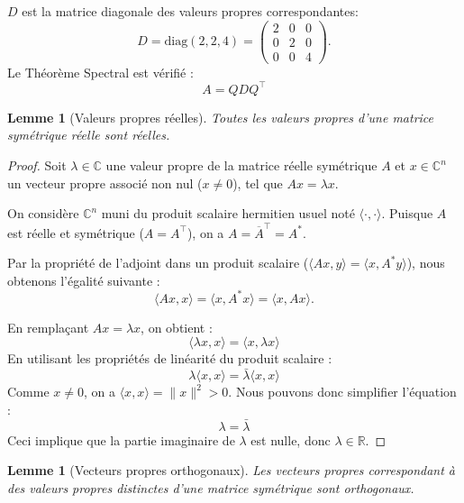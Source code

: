 \documentclass[12pt]{report}
\newtheorem{lemma}[theorem]{Lemme}
\begin{document}
\noindent $D$ est la {matrice diagonale} des valeurs propres correspondantes:
\[
    D = \text{diag}(2, 2, 4) =
    \begin{pmatrix}
        2 & 0 & 0 \\
        0 & 2 & 0 \\
        0 & 0 & 4
    \end{pmatrix}.
\]
Le Théorème Spectral est vérifié :
\[
    \boxed{A = Q D Q^{\top}}
\]

\begin{lemma}[Valeurs propres réelles]
    Toutes les valeurs propres d'une matrice symétrique réelle sont réelles.
\end{lemma}

\begin{proof}
    Soit $\lambda \in \mathbb{C}$ une valeur propre de la matrice réelle symétrique $A$ et $x \in \mathbb{C}^n$ un vecteur propre associé non nul ($x \neq 0$), tel que $Ax = \lambda x$.

    \noindent On considère $\mathbb{C}^n$ muni du produit scalaire hermitien usuel noté $\langle \cdot, \cdot \rangle$.
    Puisque $A$ est réelle et symétrique ($A = A^\top$), on a $A = \overline{A}^\top = A^*$.

    \noindent Par la propriété de l'adjoint dans un produit scalaire ($\langle Ax, y \rangle = \langle x, A^* y \rangle$), nous obtenons l'égalité suivante :
    \[
        \langle Ax, x \rangle = \langle x, A^* x \rangle = \langle x, Ax \rangle.
    \]

    \noindent En remplaçant $A x = \lambda x$, on obtient :
    \[
        \langle \lambda x, x \rangle = \langle x, \lambda x \rangle
    \]
    En utilisant les propriétés de linéarité du produit scalaire :
    \[
        \lambda \langle x, x \rangle = \bar{\lambda} \langle x, x \rangle
    \]
    Comme $x \neq 0$, on a $\langle x, x \rangle = \|x\|^2 > 0$. Nous pouvons donc simplifier l'équation :
    \[
        \lambda = \bar{\lambda}
    \]
    Ceci implique que la partie imaginaire de $\lambda$ est nulle, donc $\lambda \in \mathbb{R}$.
\end{proof}

\begin{lemma}[Vecteurs propres orthogonaux]
    Les vecteurs propres correspondant à des valeurs propres distinctes d'une matrice symétrique sont orthogonaux.
\end{lemma}
\end{document}
